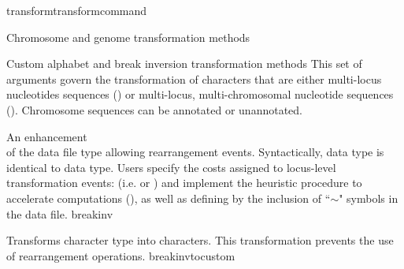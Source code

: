 \begin{command}{transform}{transformcommand}
\begin{arguments}
\begin{argumentgroup}{Chromosome and genome transformation methods}
\begin{description}
               \end{description}
        \end{argumentgroup}
        
\begin{argumentgroup}{Custom alphabet and break inversion transformation methods}   
     	This set of arguments govern the transformation of characters that are either multi-locus nucleotides 
	sequences () or multi-locus, multi-chromosomal nucleotide
	sequences ().  Chromosome sequences can be \poyargument
	{annotated} or unannotated.
	
                {An enhancement \\ of the data file type  allowing
           	 rearrangement events. Syntactically,  data type is identical to 
            	 data type. Users specify 
                the costs assigned to locus-level transformation events: (i.e. 
                 or  ) 
                and implement the heuristic  procedure to accelerate computations 
                (), as well as defining  by the 
                inclusion of ``$\sim$" symbols in the data file.} 
                {breakinv}
                
                {Transforms  character type into  characters.
                This transformation prevents the use of rearrangement operations.}
                 {breakinvtocustom}

                

\end{argumentgroup}
\end{arguments}
\end{command}
